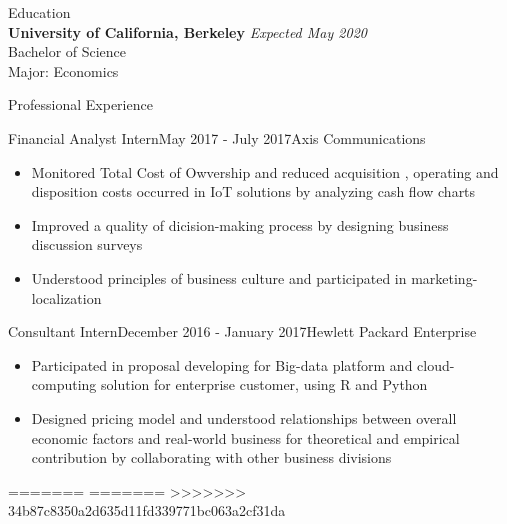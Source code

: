 \documentclass{resume}
\begin{document}
\begin{rSection}{Education}
\\{\bf University of California, Berkeley} \hfill {\em Expected May 2020} 
\\ Bachelor of Science 
\\ Major: Economics


\end{rSection}


\begin{rSection}{Professional Experience}

\begin{rSubsection}{Financial Analyst Intern}{May 2017 - July 2017}{Axis Communications}{}
\begin{itemize}
\item Monitored Total Cost of Owvership and reduced acquisition , operating and disposition costs occurred in IoT solutions by analyzing cash flow charts
\item Improved a quality of dicision-making process by designing business discussion surveys
\item Understood principles of business culture and participated in marketing-localization
\end{itemize}
\end{rSubsection}

\begin{rSubsection}{Consultant Intern}{December 2016 - January 2017}{Hewlett Packard Enterprise}{}
\begin{itemize}
\item Participated in proposal developing for Big-data platform and cloud-computing solution for enterprise customer, using R and Python
\item Designed pricing model and understood relationships between overall economic factors and real-world business for theoretical and empirical contribution by collaborating with other business divisions
\end{itemize}
\end{rSubsection}
=======
=======
>>>>>>> 34b87c8350a2d635d11fd339771bc063a2cf31da
%
%
%
%


\end{rSection}
\end{document}
